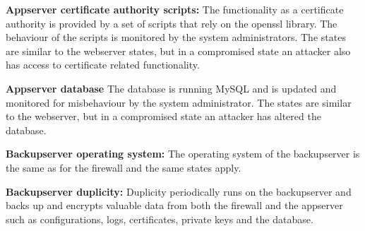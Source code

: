 \documentclass[english]{article}
\begin{document}
\begin{description}
		\item{\textbf{Appserver certificate authority scripts:}} The functionality as a certificate authority is provided by a set of scripts that rely on the openssl library. The behaviour of the scripts is monitored by the system administrators. The states are similar to the webserver states, but in a compromised state an attacker also has access to certificate related functionality.
		\item{\textbf{Appserver database}} The database is running MySQL and is updated and monitored for misbehaviour by the system administrator. The states are similar to the webserver, but in a compromised state an attacker has altered the database.
		\item{\textbf{Backupserver operating system:}} The operating system of the backupserver is the same as for the firewall and the same states apply.
		\item{\textbf{Backupserver duplicity:}} Duplicity periodically runs on the backupserver and backs up and encrypts valuable data from both the firewall and the appserver such as configurations, logs, certificates, private keys and the database.
	\end{description}
\end{document}
